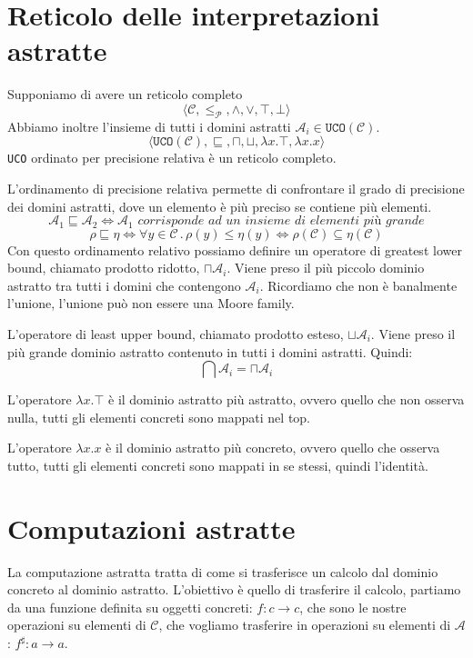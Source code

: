 \section{Reticolo delle interpretazioni astratte}
Supponiamo di avere un reticolo completo
\[
    \langle \mathcal{C}, \leq_\mathcal{P}, \land, \lor, \top, \bot \rangle
\]
Abbiamo inoltre l'insieme di tutti i domini astratti $\mathcal{A}_i \in \texttt{UCO}(\mathcal{C})$.
\[
    \langle \texttt{UCO}(\mathcal{C}), \sqsubseteq, \sqcap, \sqcup, \lambda x . \top,
    \lambda x . x \rangle
\] 
\texttt{UCO} ordinato per precisione relativa è un reticolo completo. 

L'ordinamento di precisione relativa permette di confrontare il grado di precisione dei domini 
astratti, dove un elemento è più preciso se contiene più elementi. 
\[
  \mathcal{A}_1 \sqsubseteq \mathcal{A}_2 \iff \mathcal{A}_1 \textit{ corrisponde ad un insieme 
  di elementi più grande} 
\]
\[
    \rho \sqsubseteq \eta \iff \forall y \in \mathcal{C} \, . \, \rho(y) \leq \eta(y)
    \iff \rho(\mathcal{C}) \subseteq \eta(\mathcal{C})
\]
Con questo ordinamento relativo possiamo definire un operatore di greatest lower bound, 
chiamato prodotto ridotto, $\sqcap \mathcal{A}_i$. Viene preso il più piccolo dominio astratto tra 
tutti i domini che contengono $\mathcal{A}_i$. Ricordiamo che non è banalmente l'unione, l'unione 
può non essere una {Moore family}.

L'operatore di least upper bound, chiamato prodotto esteso, $\sqcup \mathcal{A}_i$.
Viene preso il più grande dominio astratto contenuto in tutti i domini astratti.
Quindi:
\[
    \bigcap \mathcal{A}_i = \sqcap \mathcal{A}_i
\]

L'operatore $\lambda x . \top$ è il dominio astratto più astratto, ovvero quello che 
non osserva nulla, tutti gli elementi concreti sono mappati nel top.

L'operatore $\lambda x . x$ è il dominio astratto più concreto, ovvero quello che
osserva tutto, tutti gli elementi concreti sono mappati in se stessi, quindi l'identità.
\section{Computazioni astratte}
La computazione astratta tratta di come si trasferisce un calcolo dal dominio concreto al
dominio astratto.
L'obiettivo è quello di trasferire il calcolo, partiamo da una funzione definita su
oggetti concreti: $f : c \to c$, che sono le nostre operazioni su elementi di $\mathcal{C}$, 
che vogliamo trasferire in operazioni su elementi di $\mathcal{A}$: $f^\sharp : a \to a$.

